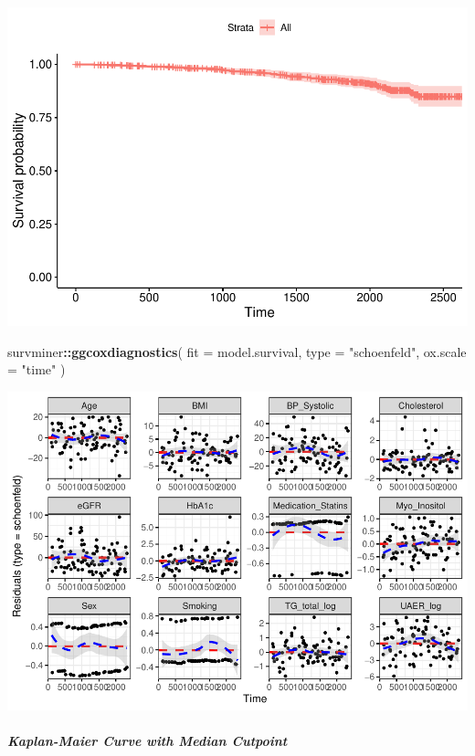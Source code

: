 \documentclass[]{article}
\newenvironment{Shaded}{\begin{snugshade}}{\end{snugshade}}
\newcommand{\DataTypeTok}[1]{\textcolor[rgb]{0.13,0.29,0.53}{#1}}
\newcommand{\KeywordTok}[1]{\textcolor[rgb]{0.13,0.29,0.53}{\textbf{#1}}}
\newcommand{\NormalTok}[1]{#1}
\newcommand{\OperatorTok}[1]{\textcolor[rgb]{0.81,0.36,0.00}{\textbf{#1}}}
\newcommand{\StringTok}[1]{\textcolor[rgb]{0.31,0.60,0.02}{#1}}
\let\oldsubparagraph\subparagraph
\renewcommand{\subparagraph}[1]{\oldsubparagraph{#1}\mbox{}}
\begin{document}
\includegraphics{0033_PROFIL--Metabolomics_files/figure-latex/Myo-I-Mortality-Adjusted-Diagnostics-1.pdf}

\begin{Shaded}
\begin{Highlighting}[]
\NormalTok{survminer}\OperatorTok{::}\KeywordTok{ggcoxdiagnostics}\NormalTok{(}
  \DataTypeTok{fit =}\NormalTok{ model.survival, }
  \DataTypeTok{type =} \StringTok{"schoenfeld"}\NormalTok{, }
  \DataTypeTok{ox.scale =} \StringTok{"time"}
\NormalTok{)}
\end{Highlighting}
\end{Shaded}

\includegraphics{0033_PROFIL--Metabolomics_files/figure-latex/Myo-I-Mortality-Adjusted-Diagnostics-2.pdf}

\newpage

\hypertarget{kaplan-maier-curve-with-median-cutpoint-2}{%
\subparagraph{Kaplan-Maier Curve with Median
Cutpoint}\label{kaplan-maier-curve-with-median-cutpoint-2}}
\end{document}
